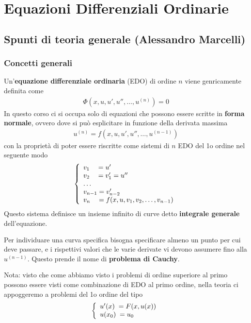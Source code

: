 \chapter{Equazioni Differenziali Ordinarie}



\section{Spunti di teoria generale (Alessandro Marcelli)}

\subsection{Concetti generali}

Un'\textbf{equazione differenziale ordinaria} (EDO) di ordine $n$ viene genricamente definita come
\begin{align}
	\Phi(x, u, u', u'', \dots, u^{(n)}) = 0
\end{align}
In questo corso ci si occupa solo di equazioni che possono essere scritte in \textbf{forma normale}, ovvero dove si può esplicitare in funzione della derivata massima
\begin{align}
	u^{(n)}=f(x, u, u', u'', \dots, u^{(n-1)})
\end{align}
con la proprietà di poter essere riscritte come sistemi di $n$ EDO del 1o ordine
nel seguente modo
\begin{align}
	\left\{\begin{array}{c}
		v_1 \quad = u' \hfill \\
		v_2 \quad = v_1' = u'' \hfill \\
		\dots \hfill \\
		v_{n-1} = v_{n-2}' \hfill \\
		v_n \quad = f(x, u, v_1, v_2, \dots, v_{n-1}) \hfill 
	\end{array}
	\right.
\end{align}
Questo sistema definisce un insieme infinito di curve detto \textbf{integrale generale} dell'equazione.

Per individuare una curva specifica bisogna specificare almeno un punto  per cui deve passare, e i rispettivi valori che le varie derivate vi devono assumere fino alla $u^{(n-1)}$. Questo prende il nome di \textbf{problema di Cauchy}.

Nota: visto che come abbiamo visto i problemi di ordine superiore al primo possono essere visti come combinazione di EDO al primo ordine, nella teoria ci appoggeremo a problemi del 1o ordine del tipo
\begin{align}
	\left\{\begin{array}{c}
		u'(x) \; = F(x,u(x)) \hfill \\
		u(x_0) \;  = u_0 \hfill 
	\end{array}
	\right.
\end{align}

